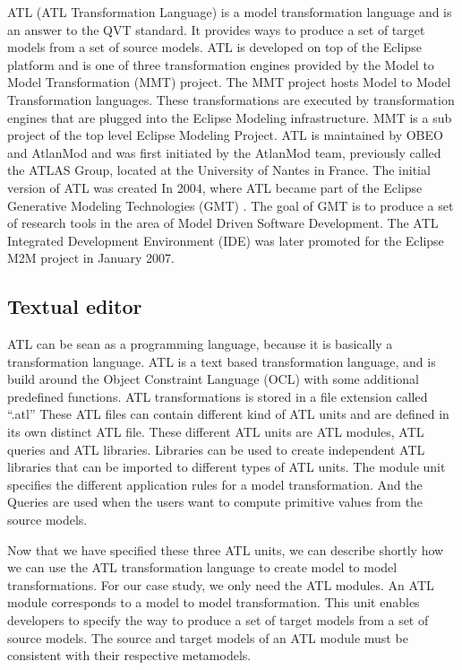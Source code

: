 \documentclass[pdftex,11pt,a4paper]{article}
\begin{document}
\noindent ATL\cite{ATL} (ATL Transformation Language) is a model transformation
language and is an answer to the QVT\cite{QVT} standard. It
provides ways to produce a set of target models from a set of source models.
ATL is developed on top of the Eclipse platform and is one of three
transformation engines provided by the Model to Model Transformation (MMT)
project\cite{MMT}. The MMT project hosts Model to Model Transformation
languages. These transformations are executed by transformation engines that are
plugged into the Eclipse Modeling infrastructure. MMT is a sub project of the
top level Eclipse Modeling Project\cite{EMP}. ATL is maintained by
OBEO\cite{OBEO} and AtlanMod\cite{ATLANMod} and was first initiated by the
AtlanMod team, previously called the ATLAS Group, located at the University of
Nantes in France. The initial version of ATL was created In 2004, where ATL
became part of the Eclipse Generative Modeling Technologies (GMT) \cite{GMT}.
The goal of GMT is to produce a set of research tools in the area of Model
Driven Software Development. The ATL Integrated Development Environment (IDE)
was later promoted for the Eclipse M2M project in January 2007.

\subsection{Textual editor}

\noindent ATL can be sean as a programming language, because it is
basically a transformation language. ATL is a text based transformation
language, and is build around the Object Constraint Language (OCL) \cite{OCL}
with some additional predefined functions. ATL transformations is stored in a
file extension called ``.atl'' These ATL files can contain different kind of
ATL units and are defined in its own distinct ATL file. These different ATL
units are ATL modules, ATL queries and ATL libraries. Libraries can be used to
create independent ATL libraries that can be imported to different types of ATL
units. The module unit specifies the different application rules for a  model
transformation. And the Queries are used when the users want to compute
primitive values from the source models.

Now that we have specified these three ATL units, we can describe shortly how
we can use the ATL transformation language to create model to model
transformations. For our case study, we only need the ATL modules. An ATL module
corresponds to a model to model transformation. This unit enables developers to
specify the way to produce a set of target models from a set of source models.
The source and target models of an ATL module must be consistent with their
respective metamodels. 
\end{document}

